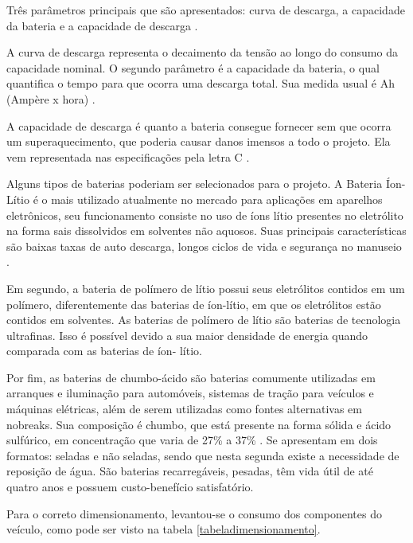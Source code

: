 \begin{itemize}
    Três parâmetros principais que são apresentados: curva de descarga, a capacidade da bateria e a capacidade de
    descarga \cite{MEGGLIAR}.

    A curva de descarga representa o decaimento da tensão ao longo do consumo da capacidade nominal. O segundo parâmetro
    é a capacidade da bateria, o qual quantifica o tempo para que ocorra uma descarga total. Sua medida usual é Ah
    (Ampère x hora) \cite{MEGGLIAR}.

    A capacidade de descarga é quanto a bateria consegue fornecer sem que ocorra um superaquecimento, que poderia
    causar danos imensos a todo o projeto. Ela vem representada nas especificações pela letra C \cite{MEGGLIAR}.

    Alguns tipos de baterias poderiam ser selecionados para o projeto. A Bateria Íon- Lítio é o mais utilizado atualmente
    no mercado para aplicações em aparelhos eletrônicos, seu funcionamento consiste no uso de íons lítio presentes no
    eletrólito na forma sais dissolvidos em solventes não aquosos. Suas principais características são baixas taxas de auto
    descarga, longos ciclos de vida e segurança no manuseio \cite{castillo2002advances}.

    Em segundo, a bateria de polímero de lítio possui seus eletrólitos contidos em um polímero, diferentemente das baterias
    de íon-lítio, em que os eletrólitos estão contidos em solventes. As baterias de polímero de lítio são baterias de tecnologia
    ultrafinas. Isso é possível devido a sua maior densidade de energia quando comparada com as baterias de íon- lítio.

    Por fim, as baterias de chumbo-ácido são baterias comumente utilizadas em arranques e iluminação para automóveis,
    sistemas de tração para veículos e máquinas elétricas, além de serem utilizadas como fontes alternativas em nobreaks.
    Sua composição é chumbo, que está presente na forma sólida e ácido sulfúrico, em concentração que varia de 27\% a 37\% 
    \cite{pulsada2005juliano}. Se apresentam em dois formatos: seladas e não seladas, sendo que nesta segunda existe a necessidade de
    reposição de água. São baterias recarregáveis, pesadas, têm vida útil de até quatro anos e possuem custo-benefício satisfatório.

    Para o correto dimensionamento, levantou-se o consumo dos componentes do veículo, como pode ser visto na tabela \ref{tabeladimensionamento}.


\end{itemize}
